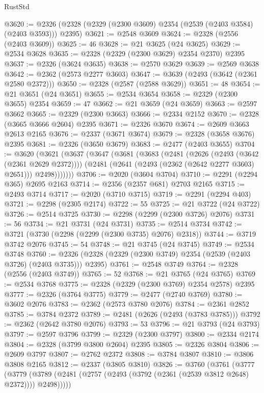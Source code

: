\begin{lexlean}{RustStd}
\begin{coremodule}
{\begin{coremodule}
{{{{{{{{{{{{{{{{{{{{{{{{{{{{{{{{{{{{{@3620 := @2326 (@2328 (@2329 (@2300 @3609) @2354 (@2539 (@2403 @3584) (@2403 @3593))) @2395)
@3621 := @2548 @3609
@3624 := @2328 (@2556 (@2403 @3609))
@3625 := 46
@3628 := @21 @3625 (@24 @3625)
@3629 := @2534 @3628
@3635 := @2328 (@2329 (@2300 @3629) @2354 @2370) @2395
@3637 := @2326 (@3624 @3635)
@3638 := @2570 @3629
@3639 := @2569 @3638
@3642 := @2362 (@2573 @2277 @3603)
@3647 := @3639 (@2493 (@3642 (@2361 @2580 @2372)))
@3650 := @2328 (@2587 (@2588 @3629))
@3651 := 48
@3654 := @21 @3651 (@24 @3651)
@3655 := @2534 @3654
@3658 := @2329 (@2300 @3655) @2354
@3659 := 47
@3662 := @21 @3659 (@24 @3659)
@3663 := @2597 @3662
@3665 := @2329 (@2300 @3663)
@3666 := @2334 @2152
@3670 := @2328 (@3665 @3666 @2604) @2395
@3671 := @2326 @3670
@3674 := @2609 @3663 @2613 @2165
@3676 := @2337 (@3671 @3674)
@3679 := @2328 (@3658 @3676) @2395
@3681 := @2326 (@3650 @3679)
@3683 := @2477 (@2403 @3655)
@3704 := @3620
    (@3621
      (@3637
        (@3647
          (@3681
            (@3683
              (@2481
                (@2626 (@2493 (@3642 (@2361 @2629 @2372))))
                (@2481 (@2641 (@2493 (@2362 (@2642 @2277 @3603) @2651))) @2498)))))))
@3706 := @2020 (@3604 @3704)
@3710 := @2291 (@2294 @365) @2695 @2163
@3714 := @2356 (@2357 @681) @2703 @2165
@3715 := @2493 @3714
@3717 := @2020 (@3710 @3715)
@3719 := @2291 (@2294 @403)
@3721 := @2298 (@2305 @2174)
@3722 := 55
@3725 := @21 @3722 (@24 @3722)
@3726 := @2514 @3725
@3730 := @2298 (@2299 (@2300 @3726) @2076)
@3731 := 56
@3734 := @21 @3731 (@24 @3731)
@3735 := @2514 @3734
@3742 := @3721 (@3730 (@2298 (@2299 (@2300 @3735) @2076) @2318))
@3744 := @3719 @3742 @2076
@3745 := 54
@3748 := @21 @3745 (@24 @3745)
@3749 := @2534 @3748
@3760 := @2326 (@2328 (@2329 (@2300 @3749) @2354 (@2539 (@2403 @3726) (@2403 @3735))) @2395)
@3761 := @2548 @3749
@3764 := @2328 (@2556 (@2403 @3749))
@3765 := 52
@3768 := @21 @3765 (@24 @3765)
@3769 := @2534 @3768
@3775 := @2328 (@2329 (@2300 @3769) @2354 @2578) @2395
@3777 := @2326 (@3764 @3775)
@3779 := @2477 (@2740 @3769)
@3780 := @3602 @2076
@3783 := @2362 (@2573 @3780 @2076)
@3784 := @2361 @2852
@3785 := @3784 @2372
@3789 := @2481 (@2626 (@2493 (@3783 @3785)))
@3792 := @2362 (@2642 @3780 @2076)
@3793 := 53
@3796 := @21 @3793 (@24 @3793)
@3797 := @2597 @3796
@3799 := @2329 (@2300 @3797)
@3800 := @2334 @2174
@3804 := @2328 (@3799 @3800 @2604) @2395
@3805 := @2326 @3804
@3806 := @2609 @3797
@3807 := @2762 @2372
@3808 := @3784 @3807
@3810 := @3806 @3808 @2165
@3812 := @2337 (@3805 @3810)
@3826 := @3760
    (@3761
      (@3777
        (@3779 (@3789 (@2481 (@2757 (@2493 (@3792 (@2361 (@2539 @3812 @2648) @2372)))) @2498)))))
}}}}}}}}}}}}}}}}}}}}}}}}}}}}}}}}}}}}}
\end{coremodule}}
\end{coremodule}
\end{lexlean}
